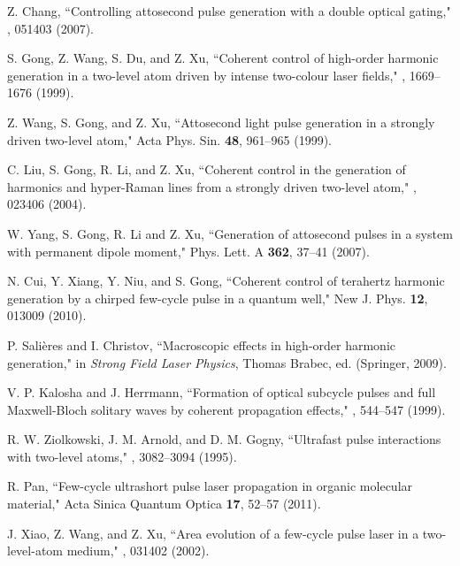 \documentclass[10pt,letterpaper]{article}
\begin{document}
\begin{thebibliography}{99}
Z. Chang, ``Controlling attosecond pulse generation with a double optical gating," , 051403 (2007).

S. Gong, Z. Wang, S. Du, and Z. Xu, ``Coherent control of high-order harmonic generation in a two-level atom driven by intense two-colour laser fields," , 1669--1676 (1999).

Z. Wang, S. Gong, and Z. Xu, ``Attosecond light pulse generation in a strongly driven two-level atom," Acta Phys. Sin. {\bf 48}, 961--965 (1999).

C. Liu, S. Gong, R. Li, and Z. Xu, ``Coherent control in the generation of harmonics and hyper-Raman lines from a strongly driven two-level atom," , 023406 (2004).

W. Yang, S. Gong, R. Li and Z. Xu, ``Generation of attosecond pulses in a system with permanent dipole moment," Phys. Lett. A {\bf 362}, 37--41 (2007).

N. Cui, Y. Xiang, Y. Niu, and S. Gong, ``Coherent control of terahertz harmonic generation by a chirped few-cycle pulse in a quantum well," New J. Phys. {\bf 12}, 013009 (2010).

P. Sali\`{e}res and I. Christov, ``Macroscopic effects in high-order harmonic
generation," in \emph{Strong Field Laser Physics}, Thomas Brabec, ed. (Springer, 2009).

V. P. Kalosha and J. Herrmann, ``Formation of optical subcycle pulses and full Maxwell-Bloch solitary waves by coherent propagation effects," , 544--547 (1999).

R. W. Ziolkowski, J. M. Arnold, and D. M. Gogny, ``Ultrafast pulse interactions with two-level atoms," , 3082--3094 (1995).


R. Pan, ``Few-cycle ultrashort pulse laser propagation in organic molecular material," Acta Sinica Quantum Optica {\bf 17}, 52--57 (2011).

J. Xiao, Z. Wang, and Z. Xu, ``Area evolution of a few-cycle pulse laser in a two-level-atom medium," , 031402 (2002).


\end{thebibliography}
\end{document}
